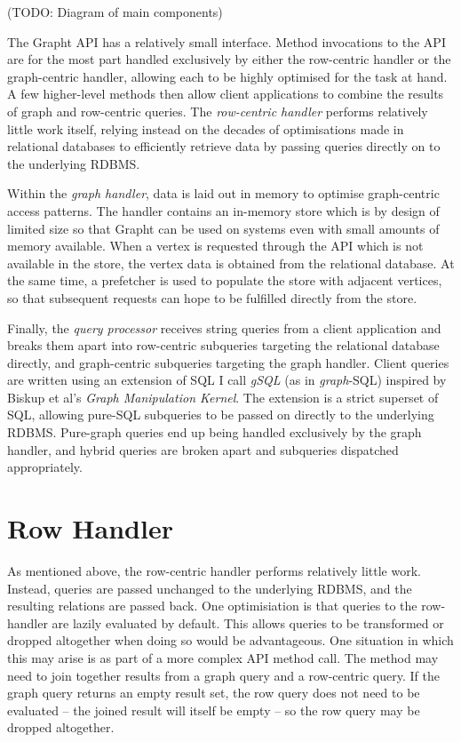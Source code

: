 (TODO: Diagram of main components)


The Grapht API has a relatively small interface. Method invocations to the API
are for the most part handled exclusively by either the row-centric handler or the graph-centric
handler, allowing each to be highly optimised for the task at hand. A few
higher-level methods then allow client applications to combine the results of
graph and row-centric queries.  The \textit{row-centric handler} performs relatively
little work itself, relying instead on the decades of optimisations made in relational
databases to efficiently retrieve data by passing queries directly on to the
underlying RDBMS.

Within the \textit{graph handler}, data is laid out in memory to optimise graph-centric
access patterns. The handler contains an in-memory store which is by design of limited size so
that Grapht can be used on systems even with small amounts of memory
available. When a vertex is requested through the API which is not available
in the store, the vertex data is obtained from the relational database. At the
same time, a prefetcher is used to populate the store with adjacent vertices,
so that subsequent requests can hope to be fulfilled
directly from the store.

Finally, the \textit{query processor} receives string queries from a client application
and breaks them apart into row-centric subqueries targeting the relational
database directly, and graph-centric subqueries targeting the graph handler.
Client queries are written using an extension of SQL I call \textit{gSQL} (as
in \textit{graph}-SQL) inspired by Biskup et al's \textit{Graph Manipulation Kernel}\cite{gSQL}. The extension is a
strict superset of SQL, allowing pure-SQL subqueries to be passed on directly to
the underlying RDBMS. Pure-graph queries end up being handled exclusively by
the graph handler, and hybrid queries are broken apart and subqueries dispatched
appropriately.






\section{Row Handler}

As mentioned above, the row-centric handler performs relatively little work.
Instead, queries are passed unchanged to the underlying RDBMS, and the
resulting relations are passed back. One optimisiation is that queries to the
row-handler are  lazily evaluated by default. This allows queries to be
transformed or dropped altogether when doing so would be advantageous. One
situation in which this may arise is as part of a more complex API method
call. The method may need to join together results from a graph query and a
row-centric query. If the graph query returns an empty result set, the  row
query does not need to be evaluated -- the joined result will itself be empty -- so the row query may be dropped altogether.






